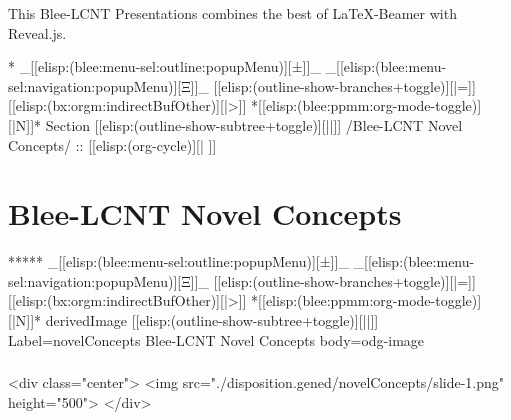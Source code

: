 \begin{whenOrg}
\begin{verblatex}
\begin{frame}[fragile,plain,label=beamerPlusReveal]
{  This Blee-LCNT Presentations combines the best of LaTeX-Beamer with Reveal.js.

}

\end{frame}
\end{verblatex}


\begin{whenOrg}
*  _[[elisp:(blee:menu-sel:outline:popupMenu)][±]]_ _[[elisp:(blee:menu-sel:navigation:popupMenu)][Ξ]]_ [[elisp:(outline-show-branches+toggle)][|=]] [[elisp:(bx:orgm:indirectBufOther)][|>]] *[[elisp:(blee:ppmm:org-mode-toggle)][|N]]*  Section    [[elisp:(outline-show-subtree+toggle)][||]]   /Blee-LCNT Novel Concepts/ ::  [[elisp:(org-cycle)][| ]]
\end{whenOrg}

\section{Blee-LCNT Novel Concepts}


\begin{whenOrg}
*****  _[[elisp:(blee:menu-sel:outline:popupMenu)][±]]_ _[[elisp:(blee:menu-sel:navigation:popupMenu)][Ξ]]_ [[elisp:(outline-show-branches+toggle)][|=]] [[elisp:(bx:orgm:indirectBufOther)][|>]] *[[elisp:(blee:ppmm:org-mode-toggle)][|N]]*  derivedImage [[elisp:(outline-show-subtree+toggle)][||]] Label=novelConcepts Blee-LCNT Novel Concepts body=odg-image
\end{whenOrg}

\begin{htmlonly}

\begin{frame}[fragile,plain,label=novelConcepts]
    \frametitle{}
    \framesubtitle{}
    \begin{rawhtml}
<div class="center">
<img src="./disposition.gened/novelConcepts/slide-1.png" height="500">
</div>
    \end{rawhtml}
\end{frame}
\end{htmlonly}


\end{whenOrg}

